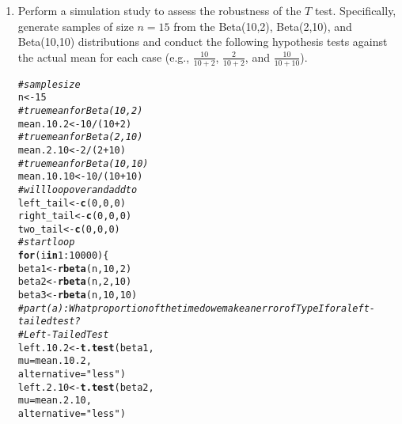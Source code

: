 \documentclass{article}\usepackage[]{graphicx}\usepackage[]{xcolor}
\makeatletter
\newcommand{\hlnum}[1]{\textcolor[rgb]{0.686,0.059,0.569}{#1}}%
\newcommand{\hlsng}[1]{\textcolor[rgb]{0.192,0.494,0.8}{#1}}%
\newcommand{\hlcom}[1]{\textcolor[rgb]{0.678,0.584,0.686}{\textit{#1}}}%
\newcommand{\hlopt}[1]{\textcolor[rgb]{0,0,0}{#1}}%
\newcommand{\hldef}[1]{\textcolor[rgb]{0.345,0.345,0.345}{#1}}%
\newcommand{\hlkwa}[1]{\textcolor[rgb]{0.161,0.373,0.58}{\textbf{#1}}}%
\newcommand{\hlkwb}[1]{\textcolor[rgb]{0.69,0.353,0.396}{#1}}%
\newcommand{\hlkwc}[1]{\textcolor[rgb]{0.333,0.667,0.333}{#1}}%
\newcommand{\hlkwd}[1]{\textcolor[rgb]{0.737,0.353,0.396}{\textbf{#1}}}%
\newenvironment{kframe}{%
 \def\at@end@of@kframe{}%
 \ifinner\ifhmode%
  \def\at@end@of@kframe{\end{minipage}}%
  \begin{minipage}{\columnwidth}%
 \fi\fi%
 \def\FrameCommand##1{\hskip\@totalleftmargin \hskip-\fboxsep
 \colorbox{shadecolor}{##1}\hskip-\fboxsep
     \hskip-\linewidth \hskip-\@totalleftmargin \hskip\columnwidth}%
 \MakeFramed {\advance\hsize-\width
   \@totalleftmargin\z@ \linewidth\hsize
   \@setminipage}}%
 {\par\unskip\endMakeFramed%
 \at@end@of@kframe}
\newenvironment{knitrout}{}{} %
\makeatother
\begin{document}
\begin{enumerate}
\begin{enumerate}
\end{enumerate}
  \item Perform a simulation study to assess the robustness of the $T$ test. 
  Specifically, generate samples of size $n=15$ from the Beta(10,2), Beta(2,10), 
  and Beta(10,10) distributions and conduct the following hypothesis tests against 
  the actual mean for each case (e.g., $\frac{10}{10+2}$, $\frac{2}{10+2}$, and 
  $\frac{10}{10+10}$).
\begin{knitrout}
\color{fgcolor}\begin{kframe}
\begin{alltt}
\hlcom{# sample size}
\hldef{n} \hlkwb{<-} \hlnum{15}
\hlcom{# true mean for Beta(10,2)}
\hldef{mean.10.2} \hlkwb{<-} \hlnum{10}\hlopt{/}\hldef{(}\hlnum{10}\hlopt{+}\hlnum{2}\hldef{)}
\hlcom{# true mean for Beta(2,10)}
\hldef{mean.2.10} \hlkwb{<-} \hlnum{2}\hlopt{/}\hldef{(}\hlnum{2}\hlopt{+}\hlnum{10}\hldef{)}
\hlcom{# true mean for Beta(10,10)}
\hldef{mean.10.10} \hlkwb{<-} \hlnum{10}\hlopt{/}\hldef{(}\hlnum{10}\hlopt{+}\hlnum{10}\hldef{)}
\hlcom{# will loop over and add to}
\hldef{left_tail} \hlkwb{<-} \hlkwd{c}\hldef{(}\hlnum{0}\hldef{,}\hlnum{0}\hldef{,}\hlnum{0}\hldef{)}
\hldef{right_tail} \hlkwb{<-} \hlkwd{c}\hldef{(}\hlnum{0}\hldef{,}\hlnum{0}\hldef{,}\hlnum{0}\hldef{)}
\hldef{two_tail} \hlkwb{<-} \hlkwd{c}\hldef{(}\hlnum{0}\hldef{,}\hlnum{0}\hldef{,}\hlnum{0}\hldef{)}
\hlcom{# start loop}
\hlkwa{for} \hldef{(i} \hlkwa{in} \hlnum{1}\hlopt{:}\hlnum{10000}\hldef{)\{}
  \hldef{beta1} \hlkwb{<-} \hlkwd{rbeta}\hldef{(n,} \hlnum{10}\hldef{,} \hlnum{2}\hldef{)}
  \hldef{beta2} \hlkwb{<-} \hlkwd{rbeta}\hldef{(n,} \hlnum{2}\hldef{,} \hlnum{10}\hldef{)}
  \hldef{beta3} \hlkwb{<-} \hlkwd{rbeta}\hldef{(n,} \hlnum{10}\hldef{,} \hlnum{10}\hldef{)}
\hlcom{# part (a): What proportion of the time do we make an error of Type I for a left-tailed test?}
  \hlcom{# Left-Tailed Test}
  \hldef{left.10.2} \hlkwb{<-} \hlkwd{t.test}\hldef{(beta1,}
                  \hlkwc{mu} \hldef{= mean.10.2,}
                  \hlkwc{alternative} \hldef{=} \hlsng{"less"}\hldef{)}
  \hldef{left.2.10} \hlkwb{<-} \hlkwd{t.test}\hldef{(beta2,}
                  \hlkwc{mu} \hldef{= mean.2.10,}
                  \hlkwc{alternative} \hldef{=} \hlsng{"less"}\hldef{)}

\end{alltt}
\end{kframe}
\end{knitrout}
\end{enumerate}
\end{document}
